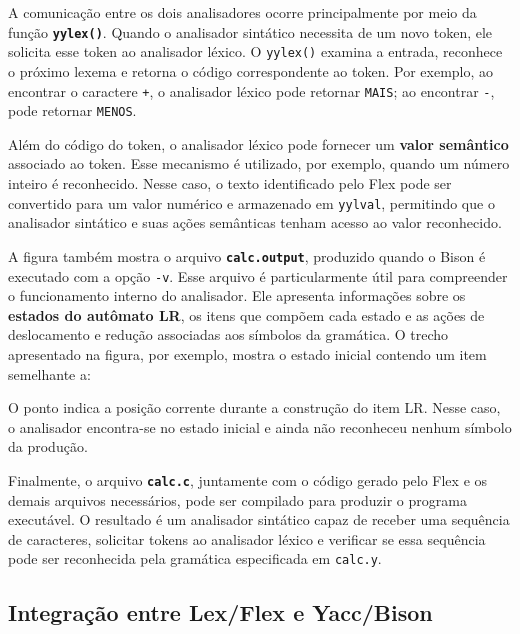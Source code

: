 \documentclass[
  brazilian,
  letterpaper,
]{book}
\newenvironment{Shaded}{\begin{snugshade}}{\end{snugshade}}
\newcommand{\NormalTok}[1]{\textcolor[rgb]{0.00,0.23,0.31}{#1}}
\theoremstyle{plain}
\theoremstyle{definition}
\theoremstyle{remark}
\begin{document}
A comunicação entre os dois analisadores ocorre principalmente por meio
da função \textbf{\texttt{yylex()}}. Quando o analisador sintático
necessita de um novo token, ele solicita esse token ao analisador
léxico. O \texttt{yylex()} examina a entrada, reconhece o próximo lexema
e retorna o código correspondente ao token. Por exemplo, ao encontrar o
caractere \texttt{+}, o analisador léxico pode retornar \texttt{MAIS};
ao encontrar \texttt{-}, pode retornar \texttt{MENOS}.

Além do código do token, o analisador léxico pode fornecer um
\textbf{valor semântico} associado ao token. Esse mecanismo é utilizado,
por exemplo, quando um número inteiro é reconhecido. Nesse caso, o texto
identificado pelo Flex pode ser convertido para um valor numérico e
armazenado em \texttt{yylval}, permitindo que o analisador sintático e
suas ações semânticas tenham acesso ao valor reconhecido.

A figura também mostra o arquivo \textbf{\texttt{calc.output}},
produzido quando o Bison é executado com a opção \texttt{-v}. Esse
arquivo é particularmente útil para compreender o funcionamento interno
do analisador. Ele apresenta informações sobre os \textbf{estados do
autômato LR}, os itens que compõem cada estado e as ações de
deslocamento e redução associadas aos símbolos da gramática. O trecho
apresentado na figura, por exemplo, mostra o estado inicial contendo um
item semelhante a:

\begin{Shaded}
\end{Shaded}

O ponto indica a posição corrente durante a construção do item LR. Nesse
caso, o analisador encontra-se no estado inicial e ainda não reconheceu
nenhum símbolo da produção.

Finalmente, o arquivo \textbf{\texttt{calc.c}}, juntamente com o código
gerado pelo Flex e os demais arquivos necessários, pode ser compilado
para produzir o programa executável. O resultado é um analisador
sintático capaz de receber uma sequência de caracteres, solicitar tokens
ao analisador léxico e verificar se essa sequência pode ser reconhecida
pela gramática especificada em \texttt{calc.y}.

\subsection{Integração entre Lex/Flex e
Yacc/Bison}\label{integrauxe7uxe3o-entre-lexflex-e-yaccbison}
\end{document}
